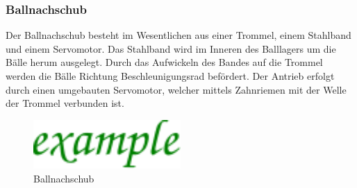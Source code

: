 \subsubsection{Ballnachschub}
Der Ballnachschub besteht im Wesentlichen aus einer Trommel, einem Stahlband 
und einem Servomotor. Das Stahlband wird im Inneren des Balllagers um die 
Bälle herum ausgelegt. Durch das Aufwickeln des Bandes auf die Trommel werden 
die Bälle Richtung Beschleunigungsrad befördert. Der Antrieb erfolgt durch einen 
umgebauten Servomotor, welcher mittels Zahnriemen mit der Welle der Trommel 
verbunden ist.

\begin{figure}[h!]
    \centering
    \includegraphics[width=0.5\textwidth]{../example/fig/example.pdf}
    \caption{Ballnachschub}
    \label{fig:ballnachschub}
\end{figure}

